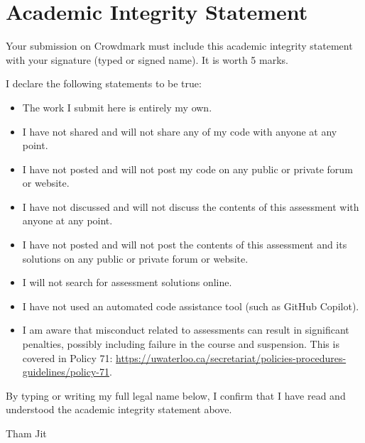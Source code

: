 \documentclass[12pt]{article}
\begin{document}
\section*{Academic Integrity Statement}

{\color{red} Your submission on Crowdmark must include this academic integrity statement with your signature (typed or signed name). It is worth 5 marks.} 

I declare the following statements to be true:

\begin{itemize}
\item 
The work I submit here is entirely my own.

\item 	
I have not shared and will not share any of my code with anyone at any point. 

\item 
I have not posted and will not post my code on any public or private forum or website.

\item 	
I have not discussed and will not discuss the contents of this assessment with anyone at any point.

\item 
I have not posted and will not post the contents of this assessment and its solutions on any public or private forum or website. 

\item 
I will not search for assessment solutions online.

\item
I have not used an automated code assistance tool (such as GitHub Copilot).

\item 
I am aware that misconduct related to assessments can result in significant penalties, possibly including failure in the course and suspension. This is covered in Policy 71: \url{https://uwaterloo.ca/secretariat/policies-procedures-guidelines/policy-71}.
\end{itemize}

By typing or writing my full legal name below, I confirm that I have read and understood the academic integrity statement above.

\vspace{30pt}

Tham Jit

\begin{minipage}{3cm}
\hrulefill
\end{minipage}
\end{document}
